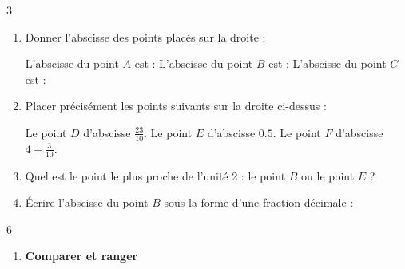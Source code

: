 \documentclass[a4paper]{book}
\begin{document}
{\begin{exerciceNote}{3}
\begin{center}
        \end{center}
        
        \medskip
        
        \begin{enumerate}[leftmargin=*]
            \item Donner l'abscisse des points placés sur la droite :
            
            L'abscisse du point $A$ est : \dotfill \quad \quad
            L'abscisse du point $B$ est : \dotfill \quad \quad
            L'abscisse du point $C$ est : \dotfill

            \medskip
    
            \item Placer précisément les points suivants sur la droite ci-dessus :
    
            Le point $D$ d'abscisse $\frac{23}{10}$. \quad \quad 
            Le point $E$ d'abscisse $0.5$. \quad \quad
            Le point $F$ d'abscisse $4 + \frac{3}{10}$.

            \medskip
    
            \item Quel est le point le plus proche de l'unité 2 : le point $B$ ou le point $E$ ? \dotfill

            \medskip
            
            \item Écrire l'abscisse du point $B$ sous la forme d'une fraction décimale : \dotfill
        \end{enumerate}   
    \end{exerciceNote}


    \begin{exerciceNote}{6}
        \begin{enumerate}[leftmargin=*]
            \item \textbf{Comparer et ranger}


\end{enumerate}
\end{exerciceNote}}
\end{document}
